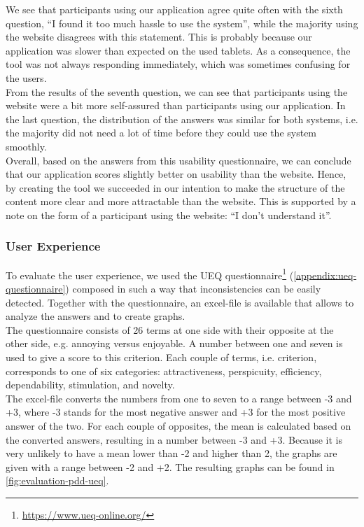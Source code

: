 We see that participants using our application agree quite often with the sixth question, ``I found it too much hassle to use the system'', while the majority using the website disagrees with this statement. This is probably because our application was slower than expected on the used tablets. As a consequence, the tool was not always responding immediately, which was sometimes confusing for the users.\\

From the results of the seventh question, we can see that participants using the website were a bit more self-assured than participants using our application. In the last question, the distribution of the answers was similar for both systems, i.e. the majority did not need a lot of time before they could use the system smoothly.\\

Overall, based on the answers from this usability questionnaire, we can conclude that our application scores slightly better on usability than the website. Hence, by creating the tool we succeeded in our intention to make the structure of the content more clear and more attractable than the website. This is supported by a note on the form of a participant using the website: ``I don't understand it''.



\subsubsection{User Experience}
To evaluate the user experience, we used the UEQ questionnaire\footnote{\url{https://www.ueq-online.org/}} (\autoref{appendix:ueq-questionnaire}) composed in such a way that inconsistencies can be easily detected. Together with the questionnaire, an excel-file is available that allows to analyze the answers and to create graphs.\\

The questionnaire consists of 26 terms at one side with their opposite at the other side, e.g. annoying versus enjoyable. A number between one and seven is used to give a score to this criterion. Each couple of terms, i.e. criterion, corresponds to one of six categories: attractiveness, perspicuity, efficiency, dependability, stimulation, and novelty.\\

The excel-file converts the numbers from one to seven to a range between -3 and +3, where -3 stands for the most negative answer and +3 for the most positive answer of the two. For each couple of opposites, the mean is calculated based on the converted answers, resulting in a number between -3 and +3. Because it is very unlikely to have a mean lower than -2 and higher than 2, the graphs are given with a range between -2 and +2. The resulting graphs can be found in \autoref{fig:evaluation-pdd-ueq}.\\

